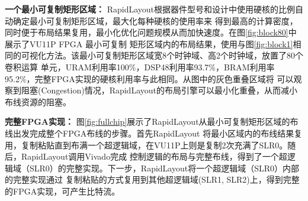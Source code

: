 {\bf 一个最小可复制矩形区域：} RapidLayout根据器件型号和设计中使用硬核的比例自动确定最小可复制矩形区域，最大化每种硬核的使用率来
得到最高的计算密度，同时便于布局结果复用，最小化优化问题规模从而加快速度。在图\ref{fig:block80}中展示了VU11P FPGA 最小可复制
矩形区域内的布局结果，使用与图\ref{fig:block1}相同的可视化方法。该最小可复制矩形区域宽8个时钟域、高2个时钟域，放置了80个卷积运算
单元，URAM利用率100\%，DSP48利用率93.7\%，BRAM利用率95.2\%，完整FPGA实现的硬核利用率与此相同。从图中的灰色重叠区域将
可以观察到阻塞(Congestion)情况，RapidLayout的布局引擎可以最小化重叠，从而减小布线资源的阻塞。

{\bf 完整FPGA实现：} 图\ref{fig:fullchip}展示了RapidLayout从最小可复制矩形区域的布线出发完成整个FPGA布线的步骤。首先RapidLayout
将最小区域内的布线结果复用，复制粘贴直到布满一个超逻辑域，在VU11P上则是复制2次充满了SLR0。随后，RapidLayout调用Vivado完成
控制逻辑的布局与完整布线，得到了一个超逻辑域（SLR0）的完整实现。下一步，RapidLayout将一个超逻辑域（SLR0）内部的完整实现通过
复制粘贴的方式复用到其他超逻辑域(SLR1, SLR2)上，得到完整的FPGA实现，可产生比特流。



